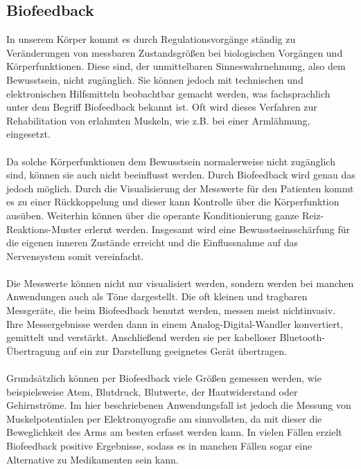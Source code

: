 \subsection{Biofeedback}
In unserem Körper kommt es durch Regulationsvorgänge ständig zu Veränderungen von messbaren Zustandsgrößen bei biologischen Vorgängen und Körperfunktionen. Diese sind, der unmittelbaren Sinneswahrnehmung, also dem Bewusstsein, nicht zugänglich. Sie können jedoch mit technischen und elektronischen Hilfsmitteln beobachtbar gemacht werden, was fachsprachlich unter dem Begriff Biofeedback bekannt ist. \cite{Src:BiofeedWiki} Oft wird dieses Verfahren zur Rehabilitation von erlahmten Muskeln, wie z.B. bei einer Armlähmung, eingesetzt. \\ \\
Da solche Körperfunktionen dem Bewusstsein normalerweise nicht zugänglich sind, können sie auch nicht beeinflusst werden. Durch Biofeedback wird genau das jedoch möglich. Durch die Visualisierung der Messwerte für den Patienten kommt es zu einer Rückkoppelung und dieser kann Kontrolle über die Körperfunktion ausüben. Weiterhin können über die operante Konditionierung ganze Reiz-Reaktions-Muster erlernt werden. Insgesamt wird eine Bewusstseinsschärfung für die eigenen inneren Zustände erreicht und die Einflussnahme auf das Nervensystem somit vereinfacht. \cite{Src:BiofeedWiki} \\ \\
Die Messwerte können nicht nur visualisiert werden, sondern werden bei manchen Anwendungen auch als Töne dargestellt. Die oft kleinen und tragbaren Messgeräte, die beim Biofeedback benutzt werden, messen meist nichtinvasiv. \cite{Src:BiofeedWiki} Ihre Messergebnisse werden dann in einem Analog-Digital-Wandler konvertiert, gemittelt und verstärkt. Anschließend werden sie per kabelloser Bluetooth-Übertragung auf ein zur Darstellung geeignetes Gerät übertragen. \\ \\
Grundsätzlich können per Biofeedback viele Größen gemessen werden, wie beispielsweise Atem, Blutdruck, Blutwerte, der Hautwiderstand oder Gehirnströme. Im hier beschriebenen Anwendungsfall ist jedoch die Messung von Muskelpotentialen per Elektromyografie am sinnvollsten, da mit dieser die Beweglichkeit des Arms am besten erfasst werden kann. In vielen Fällen erzielt Biofeedback positive Ergebnisse, sodass es in manchen Fällen sogar eine Alternative zu Medikamenten sein kann. \cite{Src:BiofeedWiki}